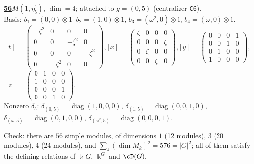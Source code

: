 \begin{samepage}\noindent\textbf{\underline{56}}\quad $M(1,\eta^{1}_{5})$, $\dim=4$; attached to $g=(0,5)$ (centralizer \texttt{C6}).\\
Basis: $b_{1}=(0,0)\otimes 1$, $b_{2}=(1,0)\otimes 1$, $b_{3}=(\omega^2,0)\otimes 1$, $b_{4}=(\omega,0)\otimes 1$.\\
$[t]=\left(\begin{smallmatrix} -\zeta^2 & 0 & 0 & 0 \\ 0 & 0 & -\zeta^2 & 0 \\ 0 & 0 & 0 & -\zeta^2 \\ 0 & -\zeta^2 & 0 & 0 \end{smallmatrix}\right)$,\quad $[x]=\left(\begin{smallmatrix} \zeta & 0 & 0 & 0 \\ 0 & 0 & 0 & \zeta \\ 0 & \zeta & 0 & 0 \\ 0 & 0 & \zeta & 0 \end{smallmatrix}\right)$,\quad $[y]=\left(\begin{smallmatrix} 0 & 0 & 0 & 1 \\ 0 & 0 & 1 & 0 \\ 0 & 1 & 0 & 0 \\ 1 & 0 & 0 & 0 \end{smallmatrix}\right)$,\quad $[z]=\left(\begin{smallmatrix} 0 & 1 & 0 & 0 \\ 1 & 0 & 0 & 0 \\ 0 & 0 & 0 & 1 \\ 0 & 0 & 1 & 0 \end{smallmatrix}\right)$.\\
Nonzero $\delta_h$: $\delta_{(0,5)}=\operatorname{diag}(1,0,0,0)$, $\delta_{(1,5)}=\operatorname{diag}(0,0,1,0)$, $\delta_{(\omega,5)}=\operatorname{diag}(0,1,0,0)$, $\delta_{(\omega^2,5)}=\operatorname{diag}(0,0,0,1)$.\end{samepage}
\medskip

\noindent Check: there are $56$ simple modules, of dimensions $1$ (12 modules), $3$ (20 modules), $4$ (24 modules), and $\sum_k(\dim M_k)^2=576=|G|^2$; all of them satisfy the defining relations of $\Bbbk G$, $\Bbbk^G$ and $\cD(G)$.
